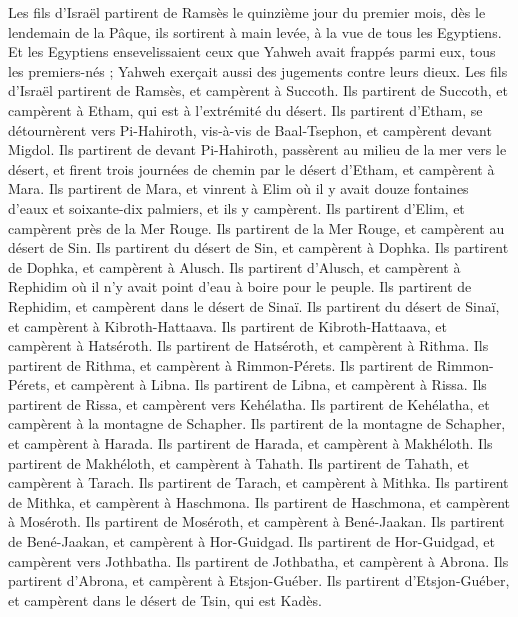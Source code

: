 \begin{multicols}{2}
Les fils d'Israël partirent de Ramsès le quinzième jour du premier mois, dès le lendemain de la Pâque, ils sortirent à main levée, à la vue de tous les Egyptiens.
Et les Egyptiens ensevelissaient ceux que Yahweh avait frappés parmi eux, tous les premiers-nés ; Yahweh exerçait aussi des jugements contre leurs dieux.
Les fils d'Israël partirent de Ramsès, et campèrent à Succoth.
Ils partirent de Succoth, et campèrent à Etham, qui est à l’extrémité du désert.
Ils partirent d'Etham, se détournèrent vers Pi-Hahiroth, vis-à-vis de Baal-Tsephon, et campèrent devant Migdol.
Ils partirent de devant Pi-Hahiroth, passèrent au milieu de la mer vers le désert, et firent trois journées de chemin par le désert d'Etham, et campèrent à Mara.
Ils partirent de Mara, et vinrent à Elim où il y avait douze fontaines d'eaux et soixante-dix palmiers, et ils y campèrent.
Ils partirent d'Elim, et campèrent près de la Mer Rouge.
Ils partirent de la Mer Rouge, et campèrent au désert de Sin.
Ils partirent du désert de Sin, et campèrent à Dophka.
Ils partirent de Dophka, et campèrent à Alusch.
Ils partirent d'Alusch, et campèrent à Rephidim où il n'y avait point d'eau à boire pour le peuple.
Ils partirent de Rephidim, et campèrent dans le désert de Sinaï.
Ils partirent du désert de Sinaï, et campèrent à Kibroth-Hattaava.
Ils partirent de Kibroth-Hattaava, et campèrent à Hatséroth.
Ils partirent de Hatséroth, et campèrent à Rithma.
Ils partirent de Rithma, et campèrent à Rimmon-Pérets.
Ils partirent de Rimmon-Pérets, et campèrent à Libna.
Ils partirent de Libna, et campèrent à Rissa.
Ils partirent de Rissa, et campèrent vers Kehélatha.
Ils partirent de Kehélatha, et campèrent à la montagne de Schapher.
Ils partirent de la montagne de Schapher, et campèrent à Harada.
Ils partirent de Harada, et campèrent à Makhéloth.
Ils partirent de Makhéloth, et campèrent à Tahath.
Ils partirent de Tahath, et campèrent à Tarach.
Ils partirent de Tarach, et campèrent à Mithka.
Ils partirent de Mithka, et campèrent à Haschmona.
Ils partirent de Haschmona, et campèrent à Moséroth.
Ils partirent de Moséroth, et campèrent à Bené-Jaakan.
Ils partirent de Bené-Jaakan, et campèrent à Hor-Guidgad.
Ils partirent de Hor-Guidgad, et campèrent vers Jothbatha.
Ils partirent de Jothbatha, et campèrent à Abrona.
Ils partirent d’Abrona, et campèrent à Etsjon-Guéber.
Ils partirent d’Etsjon-Guéber, et campèrent dans le désert de Tsin, qui est Kadès.

\end{multicols}
